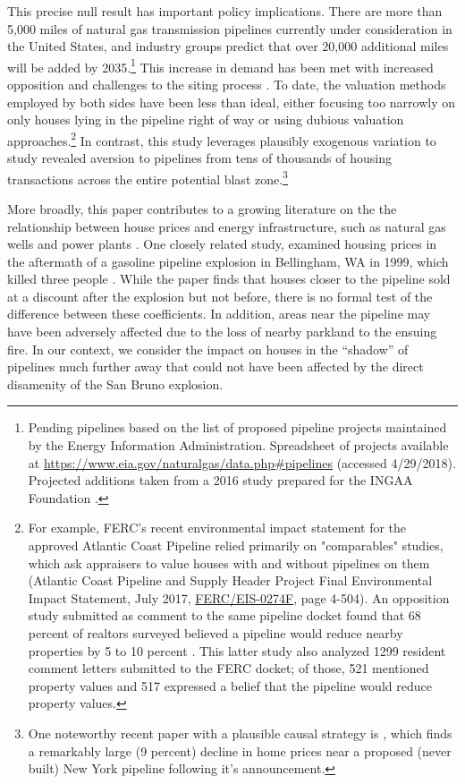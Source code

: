 \documentclass[12pt]{article}
\begin{document}
This precise null result has important policy implications. There are more than 5,000 miles of natural gas transmission pipelines currently under consideration in the United States, and industry groups predict that over 20,000 additional miles will be added by 2035.\footnote{Pending pipelines based on the list of proposed pipeline projects maintained by the Energy Information Administration. Spreadsheet of projects available at \href{https://www.eia.gov/naturalgas/data.php\#pipelines}{https://www.eia.gov/naturalgas/data.php\#{}pipelines} (accessed 4/29/2018). Projected additions taken from a 2016 study prepared for the INGAA Foundation  \citep{icf_international_north_2016}. } This increase in demand has been met with increased opposition and challenges to the siting process \citep{tierney_natural_2017}. To date, the valuation methods employed by both sides have been less than ideal, either focusing too narrowly on only houses lying in the pipeline right of way or using dubious valuation approaches.\footnote{For example, FERC's recent environmental impact statement for the approved Atlantic Coast Pipeline relied primarily on "comparables" studies, which ask appraisers to value houses with and without pipelines on them (Atlantic Coast Pipeline and Supply Header Project Final Environmental Impact Statement, July 2017, \href{https://www.ferc.gov/industries/gas/enviro/eis/2017/07-21-17-FEIS/volume-I.pdf}{FERC/EIS-0274F}, page 4-504). An opposition study submitted as comment to the same pipeline docket found that 68 percent of realtors surveyed believed a pipeline would reduce nearby properties by 5 to 10 percent \citep{phillips_economic_2016}. This latter study also analyzed 1299 resident comment letters submitted to the FERC docket; of those, 521 mentioned property values and 517 expressed a belief that the pipeline would reduce property values.} In contrast, this study leverages plausibly exogenous variation to study revealed aversion to pipelines from tens of thousands of housing transactions across the entire potential blast zone.\footnote{One noteworthy recent paper with a plausible causal strategy is \citet{BOSLETT2019}, which finds a remarkably large (9 percent) decline in home prices near a proposed (never built) New York pipeline following it's announcement.} 

More broadly, this paper contributes to a growing literature on the the relationship between house prices and energy infrastructure, such as natural gas wells \citep{muehlenbachs_housing_2015} and power plants \citep{davis_effect_2010}. One closely related study, examined housing prices in the aftermath of a gasoline pipeline explosion in Bellingham, WA in 1999, which killed three people \citep{hansen_environmental_2006}. While the paper finds that houses closer to the pipeline sold at a discount after the explosion but not before, there is no formal test of the difference between these coefficients. In addition, areas near the pipeline may have been adversely affected due to the loss of nearby parkland to the ensuing fire. In our context, we consider the impact on houses in the ``shadow'' of pipelines much further away that could not have been affected by the direct disamenity of the San Bruno explosion.
\end{document}
